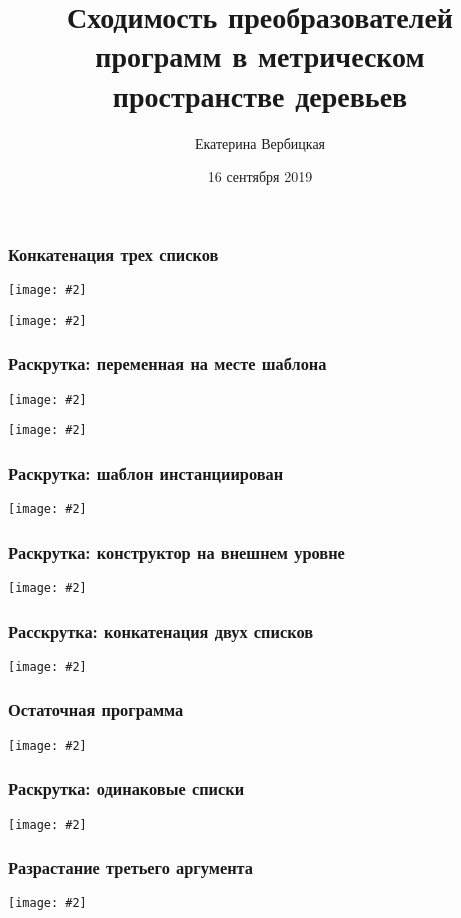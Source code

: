 \documentclass{beamer}
\title[]{Сходимость преобразователей программ в метрическом пространстве деревьев}
\subtitle[]{}
\institute[]{
Лаборатория языков инструментов JetBrains\\
}
\author[]{Екатерина Вербицкая}
\date{16 сентября 2019}
\newcommand{\incimage}[2][0.8]{ 
  \begin{center}   
    \texttt{[image: \#2]}
  \end{center}
  }
\begin{document}
{
  \begin{frame}
    \titlepage
  \end{frame}
}

\begin{frame}[fragile]
  \transwipe[direction=90]
  \frametitle{Конкатенация трех списков}

  \incimage{appdef.png}

  \incimage{apptree0.png}
\end{frame}

\begin{frame}[fragile]
  \transwipe[direction=90]
  \frametitle{Раскрутка: переменная на месте шаблона}

  \incimage{appdef.png}

  \incimage{apptree1.png}
\end{frame}

\begin{frame}[fragile]
  \transwipe[direction=90]
  \frametitle{Раскрутка: шаблон инстанциирован}

    \incimage{apptree2.png}

\end{frame}

\begin{frame}[fragile]
  \transwipe[direction=90]
  \frametitle{Раскрутка: конструктор на внешнем уровне}


    \incimage{apptree3.png}

\end{frame}

\begin{frame}[fragile]
  \transwipe[direction=90]
  \frametitle{Расскрутка: конкатенация двух списков}


    \incimage{apptree4.png}

\end{frame}

\begin{frame}[fragile]
  \transwipe[direction=90]
  \frametitle{Остаточная программа}


    \incimage{appres.png}

\end{frame}

\begin{frame}[fragile]
  \transwipe[direction=90]
  \frametitle{Раскрутка: одинаковые списки}


    \incimage{appsame0.png}

\end{frame}

\begin{frame}[fragile]
  \transwipe[direction=90]
  \frametitle{Разрастание третьего аргумента}


    \incimage{appsame1.png}

\end{frame}
\end{document}
